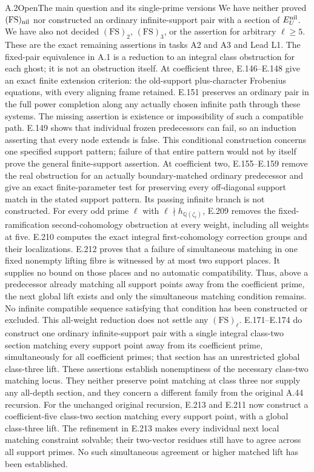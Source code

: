 \begin{result}{A.2}{Open}{The main question and its single-prime versions}
We have neither proved \((\mathrm{FS})_{\rm nil}\) nor constructed
an ordinary infinite-support pair with a section of \(E_U^{\rm nil}\).
We have also not decided \((\mathrm{FS})_2\), \((\mathrm{FS})_3\),
or the assertion for arbitrary \(\ell\ge5\).
These are the exact remaining assertions in tasks A2 and A3 and Lead L1.
The fixed-pair equivalence in A.1 is a reduction to an integral class
obstruction for each ghost; it is not an obstruction itself.
At coefficient three, E.146--E.148 give an exact finite extension
criterion: the old-support plus-character Frobenius equations, with
every aligning frame retained. E.151 preserves an ordinary pair in
the full power completion along any actually chosen infinite path
through these systems. The missing assertion is existence or
impossibility of such a compatible path. E.149 shows that individual
frozen predecessors can fail, so an induction asserting that every
node extends is false. This conditional construction concerns one
specified support pattern; failure of that entire pattern would not
by itself prove the general finite-support assertion.
At coefficient two, E.155--E.159 remove the real obstruction for
an actually boundary-matched ordinary predecessor and give an exact
finite-parameter test for preserving every off-diagonal support match
in the stated support pattern. Its passing infinite branch is not
constructed.
For every odd prime $\ell$ with
$\ell\nmid h_{\mathbb Q(\zeta_\ell)}$, E.209 removes the
fixed-ramification second-cohomology obstruction at every weight,
including all weights at five. E.210 computes the exact integral
first-cohomology correction groups and their localizations.
E.212 proves that a failure of simultaneous matching in one fixed
nonempty lifting fibre is witnessed by at most two support places.
It supplies no bound on those places and no automatic compatibility.
Thus, above a predecessor already matching all support points away
from the coefficient prime, the next global lift exists and only
the simultaneous matching condition remains. No infinite compatible
sequence satisfying that condition has been constructed or excluded.
This all-weight reduction does not settle any $(\mathrm{FS})_\ell$.
E.171--E.174 do construct one ordinary infinite-support
pair with a single integral class-two section matching every support
point away from its coefficient prime, simultaneously for all
coefficient primes; that section has an unrestricted global class-three
lift. These assertions establish nonemptiness of the necessary
class-two matching locus. They neither preserve point matching at
class three nor supply any all-depth section, and they concern a
different family from the original A.44 recursion.
For the unchanged original recursion, E.213 and E.211 now construct
a coefficient-five class-two section matching every support point,
with a global class-three lift. The refinement in E.213 makes every
individual next local matching constraint solvable; their two-vector
residues still have to agree across all support primes. No such
simultaneous agreement or higher matched lift has been established.
\end{result}

